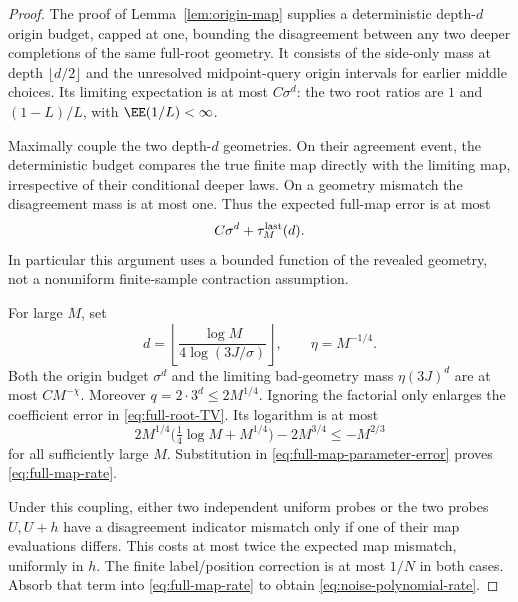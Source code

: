 \documentclass[11pt,letterpaper]{article}
\begin{document}
\begin{proof}
The proof of Lemma~\ref{lem:origin-map} supplies a deterministic
depth-$d$ origin budget, capped at one, bounding the disagreement
between any two deeper completions of the same full-root geometry.
It consists of the side-only mass at depth $\lfloor d/2\rfloor$
and the unresolved midpoint-query origin intervals for earlier
middle choices. Its limiting expectation is at most $C\sigma^d$:
the two root ratios are $1$ and $(1-L)/L$, with
$\EE(1/L)<\infty$.

Maximally couple the two depth-$d$ geometries. On their agreement
event, the deterministic budget compares the true finite map directly
with the limiting map, irrespective of their conditional deeper laws.
On a geometry mismatch the disagreement mass is at most one.
Thus the expected full-map error is at most
\begin{equation}\label{eq:full-map-parameter-error}
 C\sigma^d+\tau_M^{\rm last}(d).
\end{equation}
In particular this argument uses a bounded function of the revealed
geometry, not a nonuniform finite-sample contraction assumption.

For large $M$, set
\[
 d=\left\lfloor\frac{\log M}{4\log(3J/\sigma)}\right\rfloor,
 \qquad \eta=M^{-1/4}.
\]
Both the origin budget $\sigma^d$ and the limiting bad-geometry
mass $\eta(3J)^d$ are at most $C M^{-\chi}$.
Moreover $q=2\cdot3^d\le2M^{1/4}$.
Ignoring the factorial only enlarges the coefficient error in
\eqref{eq:full-root-TV}. Its logarithm is at most
\[
 2M^{1/4}\bigl(\tfrac14\log M+M^{1/4}\bigr)-2M^{3/4}
       \le -M^{2/3}
\]
for all sufficiently large $M$.
Substitution in \eqref{eq:full-map-parameter-error} proves
\eqref{eq:full-map-rate}.

Under this coupling, either two independent uniform probes or the
two probes $U,U+h$ have a disagreement indicator mismatch only if
one of their map evaluations differs. This costs at most twice the
expected map mismatch, uniformly in $h$.
The finite label/position correction is at most $1/N$ in both cases.
Absorb that term into \eqref{eq:full-map-rate} to obtain
\eqref{eq:noise-polynomial-rate}.
\end{proof}
\end{document}
